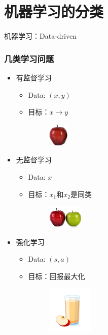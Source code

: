 \documentclass[9pt]{beamer}
\begin{document}
\section{机器学习的分类}
\begin{frame}

机器学习：Data-driven

\vspace{1em}

\frametitle{几类学习问题}
\begin{itemize}
\item 有监督学习
\begin{itemize}
\item Data: $(x,y)$
\item 目标：$x\rightarrow y$
\begin{figure}
\includegraphics[height=3em]{../fig/apple1.png}

\end{figure}
\end{itemize}\pause

\item 无监督学习
\begin{itemize}
\item Data: $x$
\item 目标：$x_1$和$x_2$是同类
\begin{figure}
\includegraphics[height=3em]{../fig/apple2.png}\pause

\end{figure}
\end{itemize}

\item 强化学习
\begin{itemize}
\item Data: $(s,a)$
\item 目标：回报最大化
\begin{figure}
\includegraphics[height=6em]{../fig/apple3.png}

\end{figure}
\end{itemize}

\end{itemize}

\end{frame}
\end{document}
